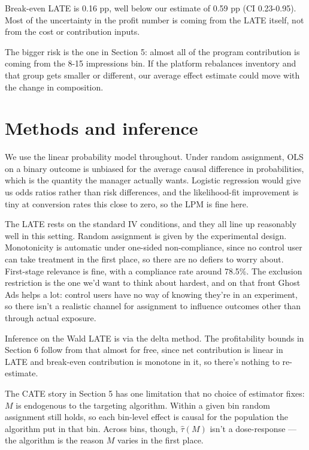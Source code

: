 \documentclass[
  letterpaper,
  DIV=11,
  numbers=noendperiod]{scrartcl}
\begin{document}
Break-even LATE is 0.16 pp, well below our estimate of 0.59 pp (CI
0.23-0.95). Most of the uncertainty in the profit number is coming from
the LATE itself, not from the cost or contribution inputs.

The bigger risk is the one in Section 5: almost all of the program
contribution is coming from the 8-15 impressions bin. If the platform
rebalances inventory and that group gets smaller or different, our
average effect estimate could move with the change in composition.

\section{Methods and inference}\label{methods-and-inference}

We use the linear probability model throughout. Under random assignment,
OLS on a binary outcome is unbiased for the average causal difference in
probabilities, which is the quantity the manager actually wants.
Logistic regression would give us odds ratios rather than risk
differences, and the likelihood-fit improvement is tiny at conversion
rates this close to zero, so the LPM is fine here.

The LATE rests on the standard IV conditions, and they all line up
reasonably well in this setting. Random assignment is given by the
experimental design. Monotonicity is automatic under one-sided
non-compliance, since no control user can take treatment in the first
place, so there are no defiers to worry about. First-stage relevance is
fine, with a compliance rate around 78.5\%. The exclusion restriction is
the one we'd want to think about hardest, and on that front Ghost Ads
helps a lot: control users have no way of knowing they're in an
experiment, so there isn't a realistic channel for assignment to
influence outcomes other than through actual exposure.

Inference on the Wald LATE is via the delta method. The profitability
bounds in Section 6 follow from that almost for free, since net
contribution is linear in LATE and break-even contribution is monotone
in it, so there's nothing to re-estimate.

The CATE story in Section 5 has one limitation that no choice of
estimator fixes: \(M\) is endogenous to the targeting algorithm. Within
a given bin random assignment still holds, so each bin-level effect is
causal for the population the algorithm put in that bin. Across bins,
though, \(\hat\tau(M)\) isn't a dose-response --- the algorithm is the
reason \(M\) varies in the first place.
\end{document}
